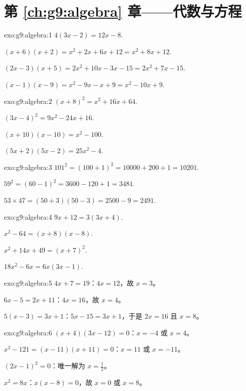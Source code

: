 \section*{第 \ref{ch:g9:algebra} 章——代数与方程}

\begin{solution}{exo:g9:algebra:1}
$4(3x - 2) = 12x - 8$.

$(x+6)(x+2) = x^2 + 2x + 6x + 12 = x^2 + 8x + 12$.

$(2x-3)(x+5) = 2x^2 + 10x - 3x - 15 = 2x^2 + 7x - 15$.

$(x-1)(x-9) = x^2 - 9x - x + 9 = x^2 - 10x + 9$.
\end{solution}

\begin{solution}{exo:g9:algebra:2}
$(x+8)^2 = x^2 + 16x + 64$.

$(3x-4)^2 = 9x^2 - 24x + 16$.

$(x+10)(x-10) = x^2 - 100$.

$(5x+2)(5x-2) = 25x^2 - 4$.
\end{solution}

\begin{solution}{exo:g9:algebra:3}
$101^2 = (100+1)^2 = 10000 + 200 + 1 = 10201$.

$59^2 = (60-1)^2 = 3600 - 120 + 1 = 3481$.

$53 \times 47 = (50+3)(50-3) = 2500 - 9 = 2491$.
\end{solution}

\begin{solution}{exo:g9:algebra:4}
$9x + 12 = 3(3x + 4)$.

$x^2 - 64 = (x+8)(x-8)$.

$x^2 + 14x + 49 = (x+7)^2$.

$18x^2 - 6x = 6x(3x - 1)$.
\end{solution}

\begin{solution}{exo:g9:algebra:5}
$4x + 7 = 19$：$4x = 12$，故 $x = 3$。

$6x - 5 = 2x + 11$：$4x = 16$，故 $x = 4$。

$5(x-3) = 3x + 1$：$5x - 15 = 3x + 1$，于是 $2x = 16$ 且 $x = 8$。
\end{solution}

\begin{solution}{exo:g9:algebra:6}
$(x+4)(3x-12) = 0$：$x = -4$ 或 $x = 4$。

$x^2 - 121 = (x-11)(x+11) = 0$：$x = 11$ 或 $x = -11$。

$(2x-1)^2 = 0$：唯一解为 $x = \frac12$。

$x^2 = 8x$：$x(x - 8) = 0$，故 $x = 0$ 或 $x = 8$。
\end{solution}

